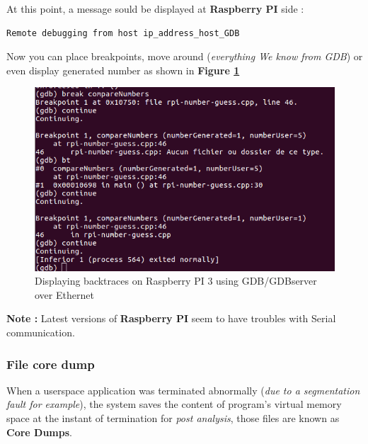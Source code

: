 \begin{enumerate}
	At this point, a message sould be displayed at \textbf{Raspberry PI} side :
	
		\begin{lstlisting}[style=BashInputStyle]
Remote debugging from host ip_address_host_GDB	
    \end{lstlisting}
    
    
Now you can place breakpoints, move around (\emph{everything We know from GDB}) or even display generated number as shown in \textbf{Figure \ref{Displaying backtraces on Raspberry PI 3 using GDB/GDBserver over Ethernet}}    
\begin{figure}[H]
		\centering
        \includegraphics[scale=0.33]{img/solution/gdb-successfull-debug-over-ethernet.png}
        \caption{Displaying backtraces on Raspberry PI 3 using GDB/GDBserver over Ethernet}
        \label{Displaying backtraces on Raspberry PI 3 using GDB/GDBserver over Ethernet}
    \end{figure}    
    

\textbf{\color{orange}Note :} Latest versions of \textbf{Raspberry PI} seem to have troubles with Serial communication.	
\end{enumerate}

\subsubsection{File core dump}
When a userspace application was terminated abnormally (\emph{due to a segmentation fault for example}), the system saves the content of program's virtual memory space at the instant of termination for \textit{post analysis}, those files are known as \textbf{Core Dumps}.

